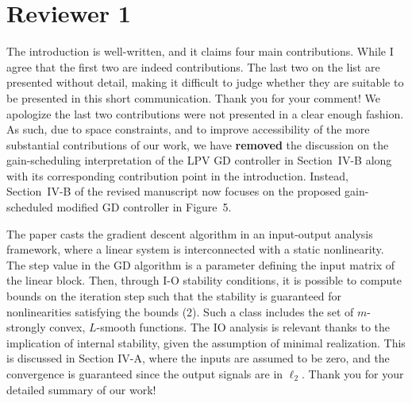 \section*{Reviewer 1}\label{sec:reviewer1}
\renewcommand{\theequation}{R1.\arabic{equation}}
\setcounter{equation}{0}
\begin{rebuttal}[resolved]
    {%
        The introduction is well-written, and it claims four main contributions. While I agree that the first two are indeed contributions. The last two on the list are presented without detail, making it difficult to judge whether they are suitable to be presented in this short communication.
    }%
    {%
        Thank you for your comment! We apologize the last two contributions were not presented in a clear enough fashion. As such, due to space constraints, and to improve accessibility of the more substantial contributions of our work, we have \textbf{removed} the discussion on the gain-scheduling interpretation of the LPV GD controller in Section~IV-B along with its corresponding contribution point in the introduction. Instead, Section~IV-B of the revised manuscript now focuses on the proposed gain-scheduled modified GD controller in Figure~5.
    }%
\end{rebuttal}
\begin{rebuttal}[resolved]
    {%
        The paper casts the gradient descent algorithm in an input-output analysis framework, where a linear system is interconnected with a static nonlinearity. The step value in the GD algorithm is a parameter defining the input matrix of the linear block. Then, through I-O stability conditions, it is possible to compute bounds on the iteration step such that the stability is guaranteed for nonlinearities satisfying the bounds (2). Such a class includes the set of $m$-strongly convex, $L$-smooth functions. The IO analysis is relevant thanks to the implication of internal stability, given the assumption of minimal realization. This is discussed in Section IV-A, where the inputs are assumed to be zero, and the convergence is guaranteed since the output signals are in \(\ell_2\).
    }%
    {%
        Thank you for your detailed summary of our work!
    }%
\end{rebuttal}
